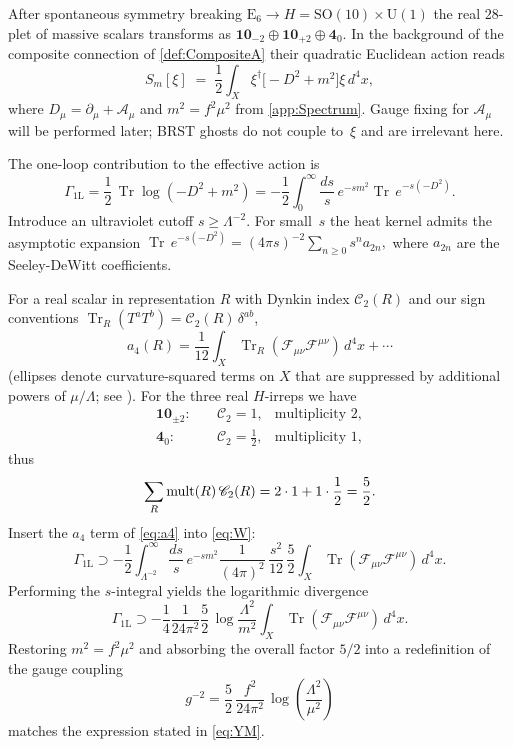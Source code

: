 \documentclass[pdflatex,sn-mathphys-num]{sn-jnl}
\theoremstyle{thmstyleone}
\theoremstyle{thmstyletwo}%
\theoremstyle{thmstylethree}%
\newcommand{\SO}[1]{\mathrm{SO(#1)}}
\newcommand{\U}[1]{\mathrm{U(#1)}}
\newcommand{\E}[1]{\mathrm{E_{#1}}}
\newcommand{\SOTen}{\SO{10}}
\newcommand{\UOne}{\U{1}}
\newcommand{\ESix}{\E{6}}
\newcommand{\Tr}{\operatorname{Tr}}
\begin{document}
\begin{appendices}
After spontaneous symmetry breaking
\(\ESix\to H=\SOTen\times \UOne\) the real
$28$-plet of massive scalars transforms as
\(
  \mathbf{10}_{-2}\oplus\mathbf{10}_{+2}\oplus\mathbf{4}_{0}\).
In the background of the composite connection of
\autoref{def:CompositeA} their quadratic Euclidean action reads
\begin{equation}\label{eq:Squad}
  S_{m}[\xi]
  \;=\;
  \frac12\int_{X}
     \xi^{\dagger}
     \bigl[-D^{2}+m^{2}\bigr]\xi\,d^{4}x,
\end{equation}
where \(D_\mu=\partial_\mu+\mathcal A_\mu\) and
\(m^{2}=f^{2}\mu^{2}\) from \autoref{app:Spectrum}.  Gauge fixing
for \(\mathcal A_\mu\) will be performed later; BRST ghosts do not
couple to~$\xi$ and are irrelevant here.

The one-loop contribution to the effective action is
\begin{equation}\label{eq:W}
  \Gamma_{\text{1L}}
  = \frac12\,
    \operatorname{Tr}\log(-D^{2}+m^{2})
  = -\frac12
    \int_{0}^{\infty}\frac{ds}{s}\,
    e^{-s m^{2}}
    \operatorname{Tr}\,e^{-s(-D^{2})}.
\end{equation}
Introduce an ultraviolet cutoff \(s\ge \Lambda^{-2}\).
For small~\(s\) the heat kernel admits the asymptotic expansion
\(
  \operatorname{Tr}\,e^{-s(-D^{2})}
  = (4\pi s)^{-2}\sum_{n\ge0} s^{n} a_{2n},
\)
where $a_{2n}$ are the Seeley-DeWitt coefficients.

For a real scalar in representation \(R\) with Dynkin index
\(\mathscr{C}_{2}(R)\) and our sign conventions
\(\Tr_{R}(T^{a}T^{b})=\mathscr{C}_{2}(R)\,\delta^{ab}\),
\begin{equation}\label{eq:a4}
  a_{4}(R)
  = \frac{1}{12}\int_{X}\Tr_{R}(\mathcal F_{\mu\nu}\mathcal F^{\mu\nu})\,
    d^{4}x
  +\cdots
\end{equation}
(ellipses denote curvature-squared terms on $X$ that are suppressed by
additional powers of \(\mu/\Lambda\); see \cite{Vassilevich:2003}). For the three real $H$-irreps we have
\[
  \begin{aligned}
  \mathbf{10}_{\pm2}: &\quad \mathscr{C}_{2}=1, & \text{multiplicity }2,\\
  \mathbf{4}_{0}:    &\quad \mathscr{C}_{2}=\frac12,& \text{multiplicity }1,
  \end{aligned}
\]
thus
\[
  \sum_{R}{\rm mult}(R)\,\mathscr{C}_{2}(R)=2\cdot1+1\cdot\frac12
  =\frac52 .
\]
Insert the $a_{4}$ term of \eqref{eq:a4} into \eqref{eq:W}:
\[
  \Gamma_{\text{1L}}
  \supset
  -\frac12\int_{\Lambda^{-2}}^{\infty}\frac{ds}{s}\,
    e^{-s m^{2}}
    \frac{1}{(4\pi)^{2}}\,
    \frac{s^{2}}{12}\,
    \frac52
    \int_{X}\Tr(\mathcal F_{\mu\nu}\mathcal F^{\mu\nu})\,d^{4}x .
\]
Performing the $s$-integral yields the logarithmic divergence
\[
  \Gamma_{\text{1L}}
  \supset
  -\frac{1}{4}
  \frac{1}{24\pi^{2}}
  \frac52\,
  \log\frac{\Lambda^{2}}{m^{2}}
  \int_{X}\Tr(\mathcal F_{\mu\nu}\mathcal F^{\mu\nu})\,d^{4}x .
\]
Restoring \(m^{2}=f^{2}\mu^{2}\) and absorbing the overall factor
\(5/2\) into a redefinition of the gauge coupling
\[
    g^{-2}=\frac{5}{2}\,\frac{f^{2}}{24\pi^{2}}\,
    \log\left(\frac{\Lambda^{2}}{\mu^{2}}\right)
\]
matches the expression stated in \eqref{eq:YM}.


\end{appendices}
\end{document}
